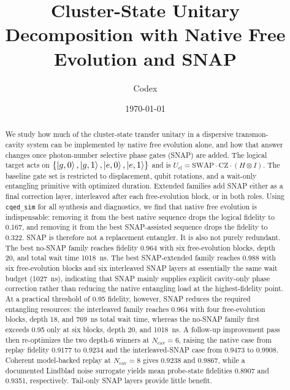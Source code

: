 \documentclass[aps,pra,twocolumn,reprint,amsmath,amssymb]{revtex4-2}
\begin{document}
\title{Cluster-State Unitary Decomposition with Native Free Evolution and SNAP}
\author{Codex}
\date{\today}

\begin{abstract}
We study how much of the cluster-state transfer unitary in a dispersive
transmon-cavity system can be implemented by native free evolution alone, and
how that answer changes once photon-number selective phase gates (SNAP) are
added. The logical target acts on
$\{\ket{g,0},\ket{g,1},\ket{e,0},\ket{e,1}\}$ and is
$U_{\mathrm{cl}}=\mathrm{SWAP}\cdot\mathrm{CZ}\cdot(H\otimes I)$. The baseline
gate set is restricted to displacement, qubit rotations, and a wait-only
entangling primitive with optimized duration. Extended families add SNAP either
as a final correction layer, interleaved after each free-evolution block, or in
both roles. Using \texttt{cqed\_sim} for all synthesis and diagnostics, we find
that native free evolution is indispensable: removing it from the best native
sequence drops the logical fidelity to 0.167, and removing it from the best
SNAP-assisted sequence drops the fidelity to 0.322. SNAP is therefore not a
replacement entangler. It is also not purely redundant. The best no-SNAP family
reaches fidelity 0.964 with six free-evolution blocks, depth 20, and total wait
time \SI{1018}{ns}. The best SNAP-extended family reaches 0.988 with six
free-evolution blocks and six interleaved SNAP layers at essentially the same
wait budget (\SI{1027}{ns}), indicating that SNAP mainly supplies explicit
cavity-only phase correction rather than reducing the native entangling load at
the highest-fidelity point. At a practical threshold of 0.95 fidelity, however,
SNAP reduces the required entangling resources: the interleaved family reaches
0.964 with four free-evolution blocks, depth 18, and \SI{769}{ns} total wait
time, whereas the no-SNAP family first exceeds 0.95 only at six blocks, depth
20, and \SI{1018}{ns}. A follow-up improvement pass then re-optimizes the two
depth-6 winners at $N_{\mathrm{cav}}=6$, raising the native case from replay
fidelity 0.9177 to 0.9234 and the interleaved-SNAP case from 0.9473 to 0.9908.
Coherent model-backed replay at $N_{\mathrm{cav}}=8$ gives 0.9238 and 0.9867,
while a documented Lindblad noise surrogate yields mean probe-state fidelities
0.8907 and 0.9351, respectively. Tail-only SNAP layers provide little benefit.
\end{abstract}

\maketitle
\end{document}
